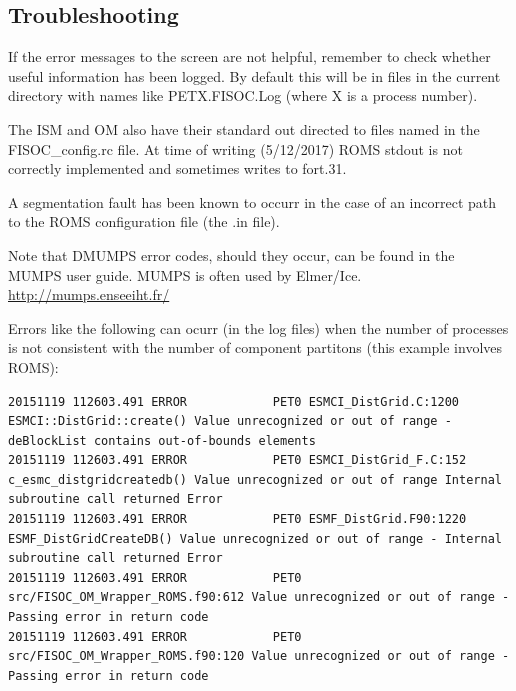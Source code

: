\documentclass[12pt]{article}
\begin{document}
\subsection{Troubleshooting}

If the error messages to the screen are not helpful, remember to check whether useful 
information has been logged.  By default this will be in files in the current directory 
with names like PETX.FISOC.Log (where X is a process number).

The ISM and OM also have their standard out directed to files named in the 
FISOC\_config.rc file. 
At time of writing (5/12/2017) ROMS stdout is not correctly implemented and sometimes 
writes to fort.31.

A segmentation fault has been known to occurr in the case of an incorrect path to the ROMS 
configuration file (the .in file). 

Note that DMUMPS error codes, should they occur, can be found in the MUMPS user guide.
MUMPS is often used by Elmer/Ice.
\url{http://mumps.enseeiht.fr/}

Errors like the following can ocurr (in the log files) when the number of processes is 
not consistent with the number of component partitons (this example involves ROMS):
\begin{lstlisting}
20151119 112603.491 ERROR            PET0 ESMCI_DistGrid.C:1200 ESMCI::DistGrid::create() Value unrecognized or out of range - deBlockList contains out-of-bounds elements
20151119 112603.491 ERROR            PET0 ESMCI_DistGrid_F.C:152 c_esmc_distgridcreatedb() Value unrecognized or out of range Internal subroutine call returned Error
20151119 112603.491 ERROR            PET0 ESMF_DistGrid.F90:1220 ESMF_DistGridCreateDB() Value unrecognized or out of range - Internal subroutine call returned Error
20151119 112603.491 ERROR            PET0 src/FISOC_OM_Wrapper_ROMS.f90:612 Value unrecognized or out of range - Passing error in return code
20151119 112603.491 ERROR            PET0 src/FISOC_OM_Wrapper_ROMS.f90:120 Value unrecognized or out of range - Passing error in return code
\end{lstlisting}
\end{document}
